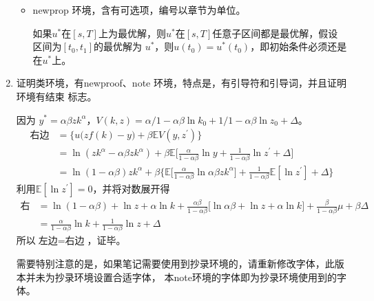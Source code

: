 \documentclass[cyan]{elegantnote}
\begin{document}
\begin{enumerate}
\begin{itemize}
\item newprop 环境，含有可选项，编号以章节为单位。

\begin{newprop}[最优性原理]
如果$u^*$在$[s,T]$上为最优解，则$u^*$在$[s,T]$任意子区间都是最优解，假设区间为$[t_0,t_1]$的最优解为
$u^*$，则$u(t_0)=u^{*}(t_0)$，即初始条件必须还是在$u^*$上。
\end{newprop}

\end{itemize}
\item 证明类环境，有{\color{main}newproof、note} 环境，特点是，有引导符和引导词，并且证明环境有结束
标志。

\begin{newproof}
因为 $y^*=\alpha\beta z k^\alpha$，$V(k,z)=\alpha/1-\alpha\beta\ln k_0+1/1-\alpha\beta \ln 
z_0+\Delta$。
\begin{align*}
\text{右边}&=\Big\{u\big(zf(k)-y\big)+\beta \mathbb{E}V(y,z^\prime)\Big\}\\
&=\ln(zk^\alpha-\alpha\beta zk^\alpha)+\beta\mathbb{E}\Big[\frac{\alpha}{1-\alpha\beta}\ln 
y+\frac{1}{1-\alpha\beta}\ln z^\prime+\Delta\Big]\\
&=\ln(1-\alpha\beta)zk^\alpha+\beta\Big\{\mathbb{E}\big[\frac{\alpha}{1-\alpha\beta}\ln 
\alpha\beta z k^\alpha\big]+\frac{1}{1-\alpha\beta}\mathbb{E}[\ln z^\prime]+\Delta\Big\}
\end{align*}
利用$\mathbb{E}[\ln z^\prime]=0$，并将对数展开得
\begin{align*}
\text{右边}&=\ln (1-\alpha\beta)+\ln z+\alpha\ln k+\frac{\alpha\beta}{1-\alpha\beta}\big[\ln 
\alpha\beta+\ln z+\alpha\ln k\big]+\frac{\beta}{1-\alpha\beta}\mu+\beta \Delta\\
&=\frac{\alpha}{1-\alpha\beta}\ln k+\frac{1}{1-\alpha\beta}\ln z+\Delta
\end{align*}
所以$\text{左边}=\text{右边}$，证毕。
\end{newproof}

\begin{note}
需要特别注意的是，如果笔记需要使用到抄录环境的，请重新修改字体，此版本并未为抄录环境设置合适字体，
本note环境的字体即为抄录环境使用到的字体。
\end{note}


\end{enumerate}
\end{document}
